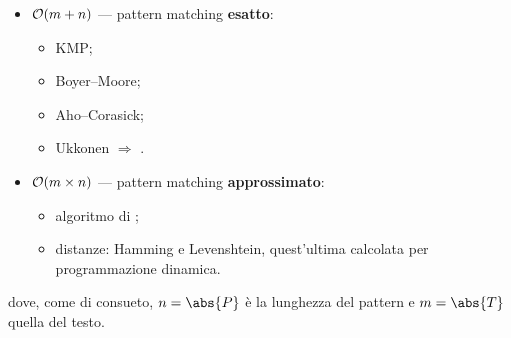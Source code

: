 %
\begin{itemize}
  \item $\mathcal{O}(m+n)$ --- pattern matching \textbf{esatto}:
    \begin{itemize}
      \item KMP;
      \item Boyer--Moore;
      \item Aho--Corasick;
      \item Ukkonen $\Rightarrow$ \STree.
    \end{itemize}
  \item $\mathcal{O}(m\times n)$ --- pattern matching \textbf{approssimato}:
    \begin{itemize}
      \item algoritmo di ;
      \item distanze: Hamming e Levenshtein, quest'ultima calcolata per
        programmazione dinamica.
    \end{itemize}
\end{itemize}

\noindent
dove, come di consueto, $n=\abs{P}$ è la lunghezza del pattern e $m=\abs{T}$
quella del testo.
